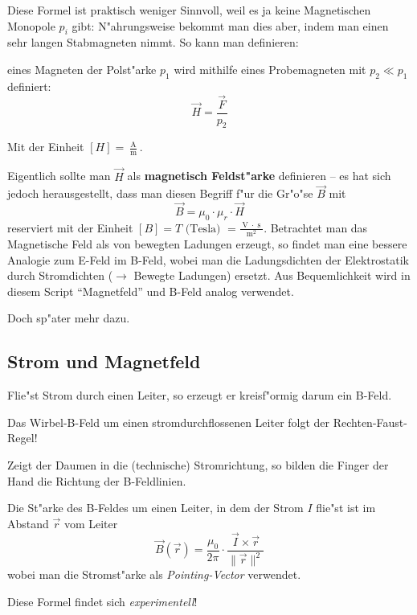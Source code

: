 Diese Formel ist praktisch weniger Sinnvoll, weil es ja keine
Magnetischen Monopole $p_i$ gibt: N"ahrungsweise bekommt man dies aber,
indem man einen sehr langen Stabmagneten nimmt. So kann man
definieren:
\begin{Def}
    eines
   Magneten der Polst"arke $p_1$ wird mithilfe eines Probemagneten  mit
   $p_2 \ll p_1$ definiert:
   \begin{equation}
      \label{eqn_differenz-c90}
      \vec H = \frac{\vec F}{p_2}
   \end{equation}
\end{Def}
Mit der Einheit $[H] = \frac{\operatorname{A}}{\operatorname{m}}$.

Eigentlich sollte man $\vec H$ als \textbf{magnetisch Feldst"arke} definieren --
es hat sich jedoch herausgestellt, dass man diesen Begriff f"ur die
Gr"o"se $\vec B$ mit
\begin{equation}
   \label{eqn_differenz-c91}
   \vec B = \mu_0 \cdot \mu_r \cdot \vec H
\end{equation}
reserviert mit der Einheit $[B] = T \text{ (Tesla) } =
\frac{\operatorname{V} \cdot
  \operatorname{s}}{\operatorname{m}^2}$. Betrachtet man das
Magnetische Feld als von bewegten Ladungen erzeugt, so findet man eine
bessere Analogie zum E-Feld im B-Feld, wobei man die Ladungsdichten
der Elektrostatik durch Stromdichten ($\to$ Bewegte Ladungen) ersetzt.
Aus Bequemlichkeit wird in diesem Script "`Magnetfeld"' und B-Feld
analog verwendet.

Doch sp"ater mehr dazu.






\subsection{Strom und Magnetfeld}
\label{kap_strom-und-magnetfeld}

Flie"st Strom durch einen Leiter, so erzeugt er kreisf"ormig darum ein
B-Feld.
\begin{Wichtig}
   Das Wirbel-B-Feld um einen stromdurchflossenen Leiter folgt der
   Rechten-Faust-Regel!
\end{Wichtig}
Zeigt der Daumen in die (technische) Stromrichtung, so bilden die
Finger der Hand die Richtung der B-Feldlinien.

\begin{Wichtig}
   Die St"arke des B-Feldes um einen Leiter, in dem der Strom $I$
   flie"st ist im Abstand $\vec r$ vom Leiter
   \begin{equation}
      \label{eqn_differenz-c92}
      \vec B(\vec r) = \frac{\mu_0}{2\pi} \cdot \frac{\vec I \times
        \vec r}{\|\vec r\|^2}
   \end{equation}
   wobei man die Stromst"arke als \emph{Pointing-Vector} verwendet.
\end{Wichtig}
Diese Formel findet sich \emph{experimentell}!

